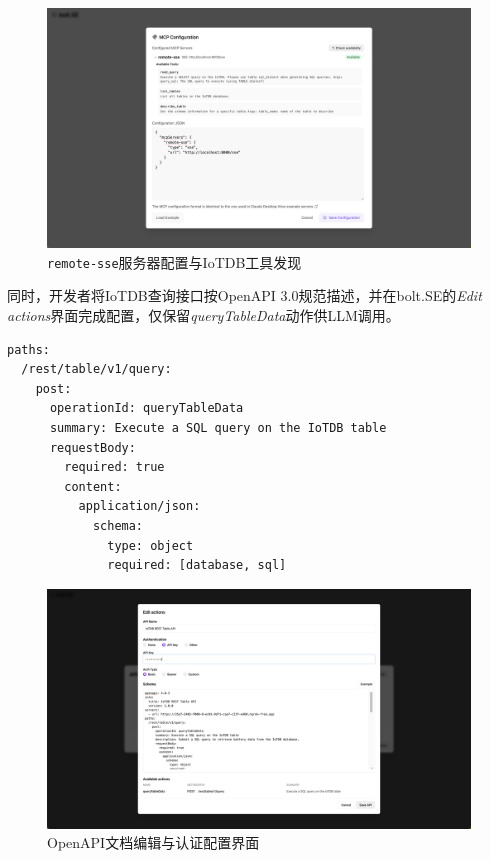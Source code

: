 \begin{figure}[H]
  \centering
  \includegraphics[width=\textwidth]{figures/screenshots/iotdb-demo/mcp-config.png}
  \caption{\texttt{remote-sse}服务器配置与IoTDB工具发现}
  \label{fig:mcp-config}
\end{figure}

同时，开发者将IoTDB查询接口按OpenAPI 3.0规范描述，并在bolt.SE的\textit{Edit actions}界面完成配置，仅保留\textit{queryTableData}动作供LLM调用。

\begin{verbatim}
paths:
  /rest/table/v1/query:
    post:
      operationId: queryTableData
      summary: Execute a SQL query on the IoTDB table
      requestBody:
        required: true
        content:
          application/json:
            schema:
              type: object
              required: [database, sql]
\end{verbatim}

\begin{figure}[H]
  \centering
  \includegraphics[width=\textwidth]{figures/screenshots/iotdb-demo/openapi-editor.png}
  \caption{OpenAPI文档编辑与认证配置界面}
  \label{fig:openapi-editor}
\end{figure}

